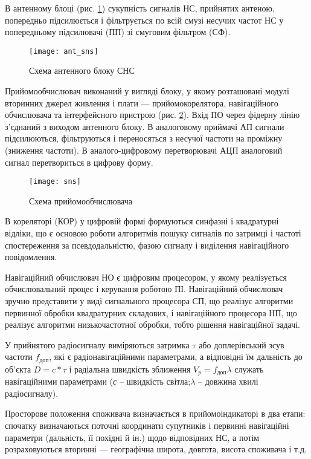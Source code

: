 В антенному блоці (рис. \ref{fig:ant_sns}) сукупність сигналів НС, прийнятих антеною, попередньо 
підсилюється і фільтрується по всій смузі несучих частот НС у попередньому підсилювачі 
(ПП) зі смуговим фільтром (СФ). 
\begin{figure}[here]
\centering
\texttt{[image: ant\_sns]}
\caption{Схема антенного блоку СНС}
\label{fig:ant_sns}
\end{figure} 

Прийомообчислювач виконаний у вигляді блоку, у якому розташовані модулі вторинних 
джерел живлення і плати --- прийомокорелятора, навігаційного обчислювача та інтерфейсного 
пристрою (рис. \ref{fig:sns}). Вхід ПО через фідерну лінію з'єднаний з виходом антенного блоку. 
В аналоговому приймачі АП сигнали підсилюються, фільтруються і переносяться з несучої 
частоти на проміжну (зниження частоти). В аналого-цифровому перетворювачі АЦП аналоговий
сигнал перетвориться в цифрову форму.
\begin{figure}[here]
\centering
\texttt{[image: sns]}
\caption{Схема прийомообчислювача}
\label{fig:sns}
\end{figure} 
В кореляторі (КОР) у цифровій формі формуються синфазні  і квадратурні  відліки, що є 
основою роботи алгоритмів пошуку сигналів по затримці і частоті спостереження за псевдодальністю, 
фазою сигналу і виділення навігаційного повідомлення.

Навігаційний обчислювач НО є цифровим процесором, у якому реалізується обчислювальний процес 
і керування роботою ПІ. Навігаційний обчислювач зручно представити у виді сигнального процесора 
СП, що реалізує алгоритми первинної обробки квадратурних складових, і навігаційного процесора 
НП, що реалізує алгоритми низькочастотної обробки, тобто рішення навігаційної задачі.

У прийнятого радіосигналу виміряються затримка $\tau$ або доплерівський зсув частоти $f_{\text{доп}}$, 
які є радіонавігаційними параметрами, а відповідні їм дальність до об'єкта $D=c*\tau$  
і радіальна швидкість зближення $V_{p}=f_{\text{доп}}\lambda$   служать навігаційними параметрами 
(\textit{с } -- швидкість світла;$\lambda$ -- довжина хвилі радіосигналу).

Просторове положення споживача визначається в прийомоіндикаторі в два етапи: спочатку визначаються 
поточні координати супутників і первинні навігаційні параметри (дальність, її похідні й ін.) щодо 
відповідних НС, а потім розраховуються вторинні --- географічна широта, довгота, висота споживача і т.д.

